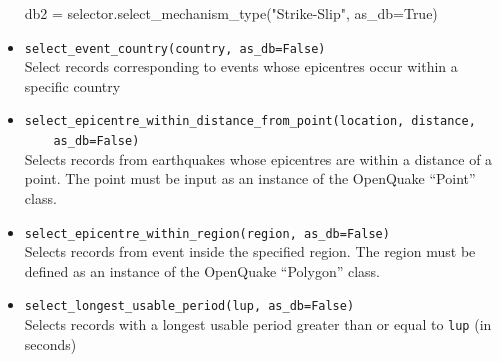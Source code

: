 \begin{itemize}
\begin{python}
db2 = selector.select_mechanism_type("Strike-Slip",
                                     as_db=True) 
\end{python}

\item \verb;select_event_country(country, as_db=False);\\

Select records corresponding to events whose epicentres occur within a specific country

\item \verb;select_epicentre_within_distance_from_point(location, distance,;\\
\verb;    as_db=False);\\

Selects records from earthquakes whose epicentres are within a distance of a point. The point must be input as an instance of the OpenQuake ``Point'' class.

\item \verb;select_epicentre_within_region(region, as_db=False);\\

Selects records from event inside the specified region. The region must be defined as an instance of the OpenQuake ``Polygon'' class.

\item \verb;select_longest_usable_period(lup, as_db=False);\\

Selects records with a longest usable period greater than or equal to \verb=lup= (in seconds)

\end{itemize}

